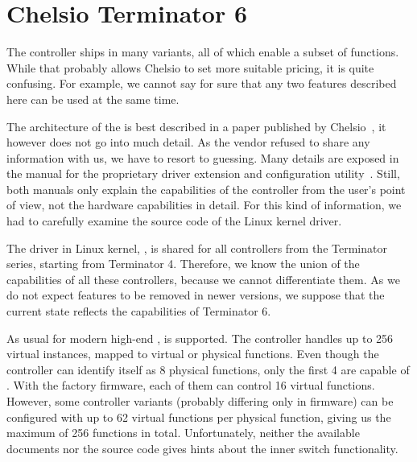 \section{Chelsio Terminator 6}

% 
% 
% 
% 
% 
% 
% 
% 
% 
% 

The controller ships in many variants, all of which enable a subset of
functions. While that probably allows Chelsio to set more suitable pricing,
it is quite confusing. For example, we cannot say for sure that any two features
described here can be used at the same time.

The architecture of the  is best described in a paper published by
Chelsio~\cite{chelsio-t6}, it however does not go into much detail. As the
vendor refused to share any information with us, we have to resort to guessing.
Many details are exposed in the manual for the proprietary driver extension
and configuration utility~\cite{chelsio-uw}. Still, both manuals only
explain the capabilities of the controller from the user's point of view, not the
hardware capabilities in detail. For this kind of information, we had to
carefully examine the source code of the Linux kernel driver.

The driver in Linux kernel, , is shared for all controllers from the
Terminator series, starting from Terminator 4. Therefore, we know the union of
the capabilities of all these controllers, because we cannot differentiate
them. As we do not expect features to be removed in newer versions, we suppose
that the current state reflects the capabilities of Terminator 6.

As usual for modern high-end ,  is supported. The controller handles up
to 256 virtual instances, mapped to virtual or physical functions. Even though
the controller can identify itself as 8 physical functions, only the first
4 are capable of . With the factory firmware, each of them can
control 16 virtual functions. However, some controller variants (probably
differing only in firmware) can be configured with up to 62 virtual functions per
physical function, giving us the maximum of 256 functions in total. Unfortunately, neither
the available documents nor the source code gives hints about the inner switch
functionality.

